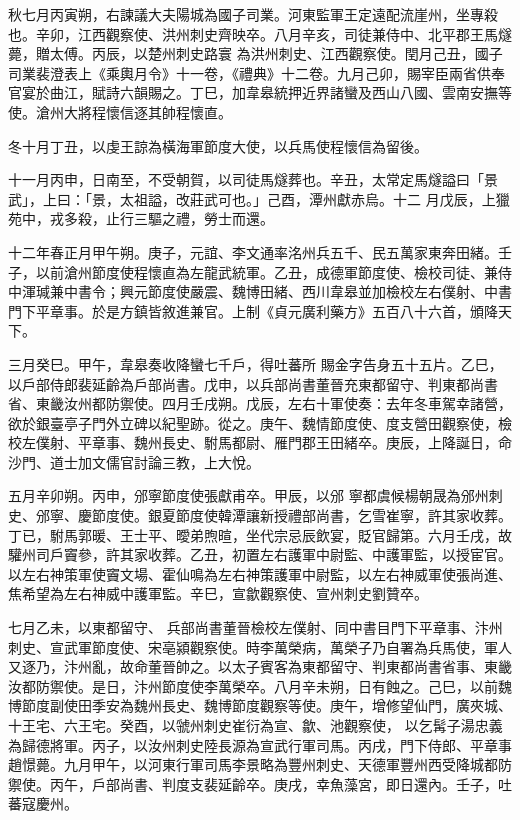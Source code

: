 \begin{pinyinscope}
 秋七月丙寅朔，右諫議大夫陽城為國子司業。河東監軍王定遠配流崖州，坐專殺也。辛卯，江西觀察使、洪州刺史齊映卒。八月辛亥，司徒兼侍中、北平郡王馬燧薨，贈太傅。丙辰，以楚州刺史路寰
 為洪州刺史、江西觀察使。閏月己丑，國子司業裴澄表上《乘輿月令》十一卷，《禮典》十二卷。九月己卯，賜宰臣兩省供奉官宴於曲江，賦詩六韻賜之。丁巳，加韋皋統押近界諸蠻及西山八國、雲南安撫等使。滄州大將程懷信逐其帥程懷直。



 冬十月丁丑，以虔王諒為橫海軍節度大使，以兵馬使程懷信為留後。



 十一月丙申，日南至，不受朝賀，以司徒馬燧葬也。辛丑，太常定馬燧謚曰「景武」，上曰：「景，太祖謚，改莊武可也。」己酉，潭州獻赤烏。十二
 月戊辰，上獵苑中，戎多殺，止行三驅之禮，勞士而還。



 十二年春正月甲午朔。庚子，元誼、李文通率洺州兵五千、民五萬家東奔田緒。壬子，以前滄州節度使程懷直為左龍武統軍。乙丑，成德軍節度使、檢校司徒、兼侍中渾瑊兼中書令；興元節度使嚴震、魏博田緒、西川韋皋並加檢校左右僕射、中書門下平章事。於是方鎮皆敘進兼官。上制《貞元廣利藥方》五百八十六首，頒降天下。



 三月癸巳。甲午，韋皋奏收降蠻七千戶，得吐蕃所
 賜金字告身五十五片。乙巳，以戶部侍郎裴延齡為戶部尚書。戊申，以兵部尚書董晉充東都留守、判東都尚書省、東畿汝州都防禦使。四月壬戌朔。戊辰，左右十軍使奏：去年冬車駕幸諸營，欲於銀臺亭子門外立碑以紀聖跡。從之。庚午、魏情節度使、度支營田觀察使，檢校左僕射、平章事、魏州長史、駙馬都尉、雁門郡王田緒卒。庚辰，上降誕日，命沙門、道士加文儒官討論三教，上大悅。



 五月辛卯朔。丙申，邠寧節度使張獻甫卒。甲辰，以邠
 寧都虞候楊朝晟為邠州刺史、邠寧、慶節度使。銀夏節度使韓潭讓新授禮部尚書，乞雪崔寧，許其家收葬。丁已，駙馬郭暖、王士平、曖弟煦暄，坐代宗忌辰飲宴，貶官歸第。六月壬戌，故驩州司戶竇參，許其家收葬。乙丑，初置左右護軍中尉監、中護軍監，以授宦官。以左右神策軍使竇文場、霍仙鳴為左右神策護軍中尉監，以左右神威軍使張尚進、焦希望為左右神威中護軍監。辛巳，宣歙觀察使、宣州刺史劉贊卒。



 七月乙未，以東都留守、
 兵部尚書董晉檢校左僕射、同中書目門下平章事、汴州刺史、宣武軍節度使、宋亳潁觀察使。時李萬榮病，萬榮子乃自署為兵馬使，軍人又逐乃，汴州亂，故命董晉帥之。以太子賓客為東都留守、判東都尚書省事、東畿汝都防禦使。是日，汴州節度使李萬榮卒。八月辛未朔，日有蝕之。己巳，以前魏博節度副使田季安為魏州長史、魏博節度觀察等使。庚午，增修望仙門，廣夾城、十王宅、六王宅。癸酉，以虢州刺史崔衍為宣、歙、池觀察使，
 以乞髯子湯忠義為歸德將軍。丙子，以汝州刺史陸長源為宣武行軍司馬。丙戌，門下侍郎、平章事趙憬薨。九月甲午，以河東行軍司馬李景略為豐州刺史、天德軍豐州西受降城都防禦使。丙午，戶部尚書、判度支裴延齡卒。庚戌，幸魚藻宮，即日還內。壬子，吐蕃寇慶州。




\end{pinyinscope}
